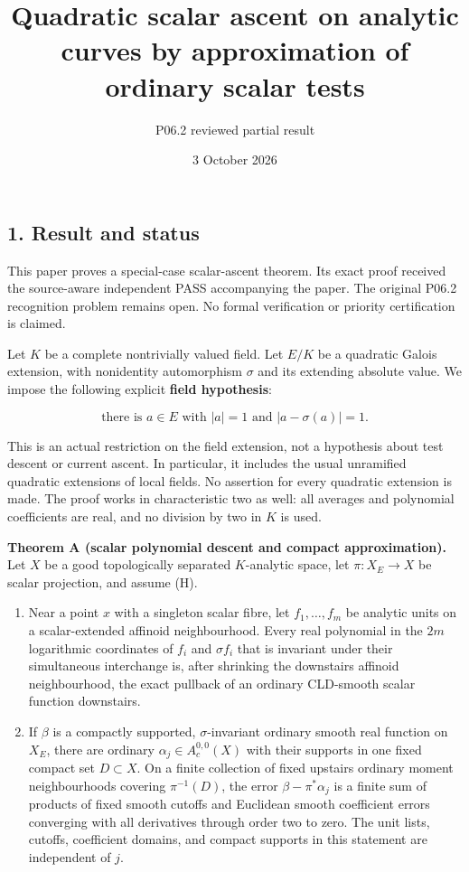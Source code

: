 \documentclass[
  11pt,
]{article}
\title{Quadratic scalar ascent on analytic curves by approximation of
ordinary scalar tests}
\author{P06.2 reviewed partial result}
\date{3 October 2026}
\providecommand{\tightlist}{%
  \setlength{\itemsep}{0pt}\setlength{\parskip}{0pt}}
\begin{document}
\maketitle

\subsection{1. Result and status}\label{result-and-status}

This paper proves a special-case scalar-ascent theorem. Its exact proof
received the source-aware independent PASS accompanying the paper. The
original P06.2 recognition problem remains open. No formal verification
or priority certification is claimed.

Let \(K\) be a complete nontrivially valued field. Let \(E/K\) be a
quadratic Galois extension, with nonidentity automorphism \(\sigma\) and
its extending absolute value. We impose the following explicit
\textbf{field hypothesis}:

\[
\text{there is }a\in E\text{ with }|a|=1\text{ and }|a-\sigma(a)|=1. \tag{H}
\]

This is an actual restriction on the field extension, not a hypothesis
about test descent or current ascent. In particular, it includes the
usual unramified quadratic extensions of local fields. No assertion for
every quadratic extension is made. The proof works in characteristic two
as well: all averages and polynomial coefficients are real, and no
division by two in \(K\) is used.

\textbf{Theorem A (scalar polynomial descent and compact
approximation).} Let \(X\) be a good topologically separated
\(K\)-analytic space, let \(\pi:X_E\to X\) be scalar projection, and
assume (H).

\begin{enumerate}
\def\labelenumi{\arabic{enumi}.}
\tightlist
\item
  Near a point \(x\) with a singleton scalar fibre, let
  \(f_1,\ldots,f_m\) be analytic units on a scalar-extended affinoid
  neighbourhood. Every real polynomial in the \(2m\) logarithmic
  coordinates of \(f_i\) and \(\sigma f_i\) that is invariant under
  their simultaneous interchange is, after shrinking the downstairs
  affinoid neighbourhood, the exact pullback of an ordinary CLD-smooth
  scalar function downstairs.
\item
  If \(\beta\) is a compactly supported, \(\sigma\)-invariant ordinary
  smooth real function on \(X_E\), there are ordinary
  \(\alpha_j\in A_c^{0,0}(X)\) with their supports in one fixed compact
  set \(D\subset X\). On a finite collection of fixed upstairs ordinary
  moment neighbourhoods covering \(\pi^{-1}(D)\), the error
  \(\beta-\pi^*\alpha_j\) is a finite sum of products of fixed smooth
  cutoffs and Euclidean smooth coefficient errors converging with all
  derivatives through order two to zero. The unit lists, cutoffs,
  coefficient domains, and compact supports in this statement are
  independent of \(j\).
\end{enumerate}
\end{document}
